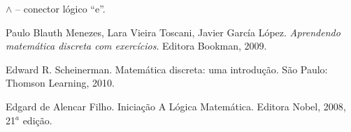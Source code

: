 \noindent $\land$ -- conector lógico ``e''.\\


\begin{thebibliography}{1}
 Paulo Blauth Menezes, Lara Vieira
Toscani, Javier García López. \emph{Aprendendo matemática discreta com
exercícios}. Editora Bookman, 2009.

 Edward R. Scheinerman. Matemática
  discreta: uma introdução. São Paulo: Thomson Learning, 2010.

 Edgard de Alencar Filho.
  {Inicia\c{c}\~ao A L\'ogica Matem\'atica}. Editora Nobel, 2008,
  21$^a$ edi\c{c}\~ao.

\end{thebibliography}


